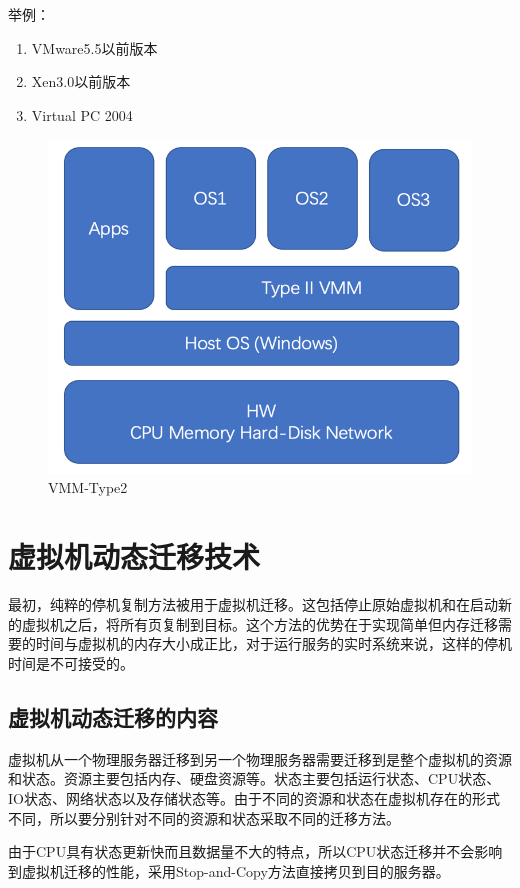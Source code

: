 举例：
\begin{enumerate}
    \item VMware5.5以前版本
    \item Xen3.0以前版本
    \item Virtual PC 2004
\end{enumerate}

\begin{figure}[htbp]
  \centering
  \includegraphics{./Figure/IMG_Chap2_3.png}
  \caption{VMM-Type2}\label{Fig:chap2_3}
\end{figure}

\section{虚拟机动态迁移技术}
最初，纯粹的停机复制方法被用于虚拟机迁移。这包括停止原始虚拟机和在启动新的虚拟机之后，将所有页复制到目标。这个方法的优势在于实现简单但内存迁移需要的时间与虚拟机的内存大小成正比，对于运行服务的实时系统来说，这样的停机时间是不可接受的。

\subsection{虚拟机动态迁移的内容}
虚拟机从一个物理服务器迁移到另一个物理服务器需要迁移到是整个虚拟机的资源和状态。资源主要包括内存、硬盘资源等。状态主要包括运行状态、CPU状态、IO状态、网络状态以及存储状态等。由于不同的资源和状态在虚拟机存在的形式不同，所以要分别针对不同的资源和状态采取不同的迁移方法。

由于CPU具有状态更新快而且数据量不大的特点，所以CPU状态迁移并不会影响到虚拟机迁移的性能，采用Stop-and-Copy方法直接拷贝到目的服务器。


